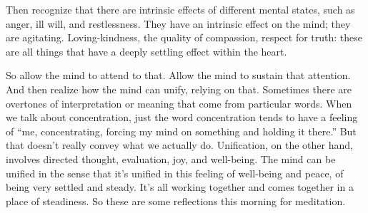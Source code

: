 Then recognize that there are intrinsic effects of different mental
states, such as anger, ill will, and restlessness. They have an
intrinsic effect on the mind; they are agitating. Loving-kindness, the
quality of compassion, respect for truth: these are all things that have
a deeply settling effect within the heart.

So allow the mind to attend to that. Allow the mind to sustain that
attention. And then realize how the mind can unify, relying on that.
Sometimes there are overtones of interpretation or meaning that come
from particular words. When we talk about concentration, just the word
concentration tends to have a feeling of “me, concentrating, forcing my
mind on something and holding it there.” But that doesn’t really convey
what we actually do. Unification, on the other hand, involves directed
thought, evaluation, joy, and well-being. The mind can be unified in the
sense that it’s unified in this feeling of well-being and peace, of
being very settled and steady. It’s all working together and comes
together in a place of steadiness. So these are some reflections this
morning for meditation.
